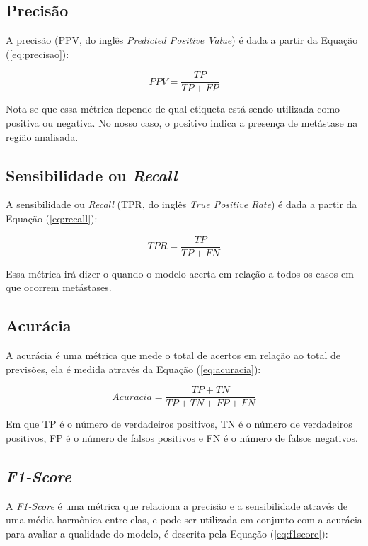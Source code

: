 \subsection{Precisão}

A precisão (PPV, do inglês \textit{Predicted Positive Value}) é dada a partir da Equação (\ref{eq:precisao}):

\begin{equation}\label{eq:precisao}
    PPV = \frac{TP}{TP+FP}
\end{equation}

Nota-se que essa métrica depende de qual etiqueta está sendo utilizada como positiva ou negativa. No nosso caso, o positivo indica a presença de metástase na região analisada.

\subsection{Sensibilidade ou \textit{Recall}}

A sensibilidade ou \textit{Recall} (TPR, do inglês \textit{True Positive Rate}) é dada a partir da Equação (\ref{eq:recall}):

\begin{equation}\label{eq:recall}
    TPR = \frac{TP}{TP+FN}
\end{equation}

Essa métrica irá dizer o quando o modelo acerta em relação a todos os casos em que ocorrem metástases.

\subsection{Acurácia}

A acurácia é uma métrica que mede o total de acertos em relação ao total de previsões, ela é medida através da Equação (\ref{eq:acuracia}):

\begin{equation}\label{eq:acuracia}
    Acuracia = \frac{TP+TN}{TP+TN+FP+FN}
\end{equation}

Em que TP é o número de verdadeiros positivos, TN é o número de verdadeiros positivos, FP é o número de falsos positivos e FN é o número de falsos negativos.

\subsection{\textit{F1-Score}}

A \textit{F1-Score} é uma métrica que relaciona a precisão e a sensibilidade através de uma média harmônica entre elas, e pode ser utilizada em conjunto com a acurácia para avaliar a qualidade do modelo, é descrita pela Equação (\ref{eq:f1score}):

